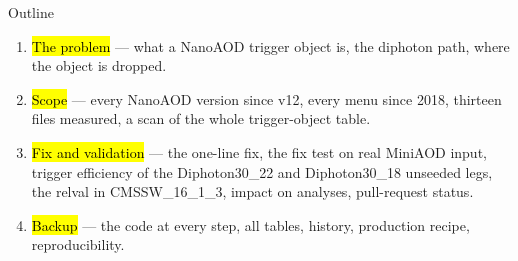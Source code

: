 \begin{frame}{Outline}
  \begin{enumerate}
    \item \hl{The problem} --- what a NanoAOD trigger object is, the diphoton path, where the object is dropped.
    \item \hl{Scope} --- every NanoAOD version since v12, every menu since 2018, thirteen files measured,
          a scan of the whole trigger-object table.
    \item \hl{Fix and validation} --- the one-line fix, the fix test on real MiniAOD input, trigger efficiency
          of the Diphoton30\_22 and Diphoton30\_18 unseeded legs, the relval in CMSSW\_16\_1\_3, impact on analyses,
          pull-request status.
    \item \hl{Backup} --- the code at every step, all tables, history, production recipe, reproducibility.
  \end{enumerate}
\end{frame}


